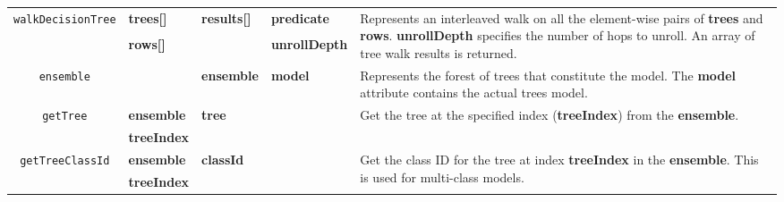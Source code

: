 \begin{table*}[htb]
{\begin{tabularx}{\linewidth}{c | l | l | l | l}
   \multirow{3}{*}{\texttt{walkDecisionTree}} & \textbf{trees[]} & \textbf{results[] }& \textbf{predicate}   & \multirow{3}{*}{\parbox{0.47\linewidth}{Represents an interleaved walk on all the element-wise pairs 
                                                                                                                    of \textbf{trees} and \textbf{rows}. \textbf{unrollDepth} specifies the number of
                                                                                                                    hops to unroll. An array of tree walk results is returned.}} \\
                                                  & \textbf{rows[]}  &                    & \textbf{unrollDepth} &  \\
                                                  &                  &                    &                      & \\
   \midrule
   \multirow{2}{*}{\texttt{ensemble}} &  & \textbf{ensemble} & \textbf{model} & \multirow{2}{*}{\parbox{0.47\linewidth}{Represents the forest of trees that constitute the model. The   
                                                                                                                       \textbf{model} attribute contains the actual trees model.}} \\
                                      &  &                 &   & \\
   \midrule
   \multirow{2}{*}{\texttt{getTree}} & \textbf{ensemble} & \textbf{tree} &  & \multirow{2}{*}{\parbox{0.47\linewidth}{Get the tree at the specified index (\textbf{treeIndex}) from the \textbf{ensemble}.}} \\   
                                                                                                                       
                                      & \textbf{treeIndex} &                 &   & \\                                                                                                                       

   \midrule
   \multirow{2}{*}{\texttt{getTreeClassId}} & \textbf{ensemble} & \textbf{classId} &  & \multirow{2}{*}{\parbox{0.47\linewidth}{Get the class ID for the tree at index \textbf{treeIndex} 
                                                                                                                               in the \textbf{ensemble}. This is used for multi-class models.}} \\    
                                            & \textbf{treeIndex} &                 &   & \\                                                                                                                       


\end{tabularx}}
\end{table*}
